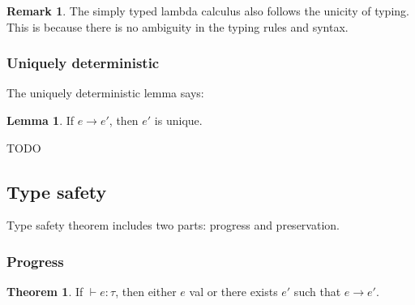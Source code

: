 \documentclass{article}
\theoremstyle{definition}
\newtheorem{theorem}{Theorem}[section]
\newtheorem{lemma}{Lemma}[section]
\newtheorem*{remark}{Remark}
\begin{document}
\begin{remark}
    The simply typed lambda calculus also follows the unicity of typing. This is because there is no ambiguity in the typing rules and syntax.
\end{remark}

\subsubsection*{Uniquely deterministic}

The uniquely deterministic lemma says:
\begin{lemma}
    If $e\longrightarrow e'$, then $e'$ is unique.
\end{lemma}

TODO

\subsection{Type safety}

Type safety theorem includes two parts: progress and preservation.

\subsubsection*{Progress}

\begin{theorem}
    If $\vdash e:\tau$, then either $e$ \textsf{val} or there exists $e'$ such that $e\longrightarrow e'$.
\end{theorem}
\end{document}
